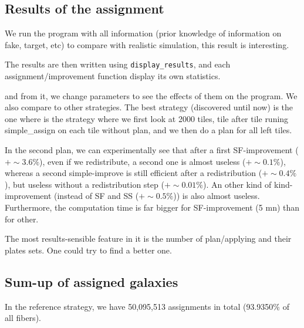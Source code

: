\documentclass{extarticle}
\begin{document}
\begin{multicols}{2}
\subsection{Results of the assignment}
We run the program with all information (prior knowledge of information on fake, target, etc) to compare with realistic simulation, this result is interesting.

The results are then written using {\tt display\_results}, and each assignment/improvement function display its own statistics.

 and from it, we change parameters to see the effects of them on the program. We also compare to other strategies. The best strategy (discovered until now) is the one where is the strategy where we first look at 2000 tiles, tile after tile runing simple\_assign on each tile without plan, and we then do a plan for all left tiles.

In the second plan, we can experimentally see that after a first SF-improvement ($+\sim 3.6\%$), even if we redistribute, a second one is almost useless ($+\sim 0.1\%$), whereas a second simple-improve is still efficient after a redistribution ($+\sim 0.4\%$), but useless without a redistribution step ($+\sim 0.01\%$). An other kind of kind-improvement (instead of SF and SS ($+\sim 0.5\%$)) is also almost useless. Furthermore, the computation time is far bigger for SF-improvement (5 mn) than for other.

The most results-sensible feature in it is the number of plan/applying and their plates sets. One could try to find a better one.

\end{multicols}

\subsection{Sum-up of assigned galaxies}
In the reference strategy, we have 50,095,513 assignments in total (93.9350\% of all fibers).
\end{document}
